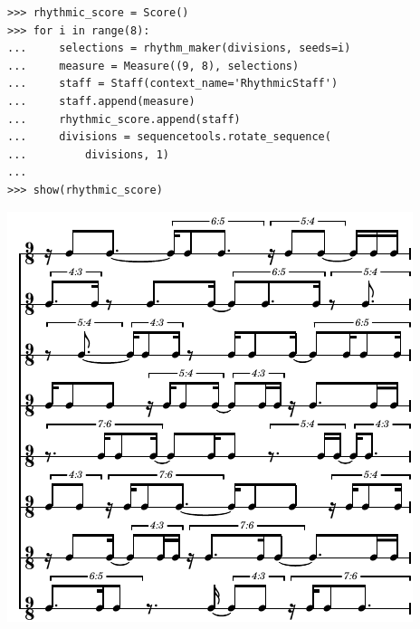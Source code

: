 \documentclass{article}
\begin{document}
\begin{lstlisting}
>>> rhythmic_score = Score()
>>> for i in range(8):
...     selections = rhythm_maker(divisions, seeds=i)
...     measure = Measure((9, 8), selections)
...     staff = Staff(context_name='RhythmicStaff')
...     staff.append(measure)
...     rhythmic_score.append(staff)
...     divisions = sequencetools.rotate_sequence(
...         divisions, 1)
...
>>> show(rhythmic_score)
\end{lstlisting}
\noindent\includegraphics{assets/lilypond-89acf493fafea6ee83e3032bbed09718.pdf}
\end{document}
